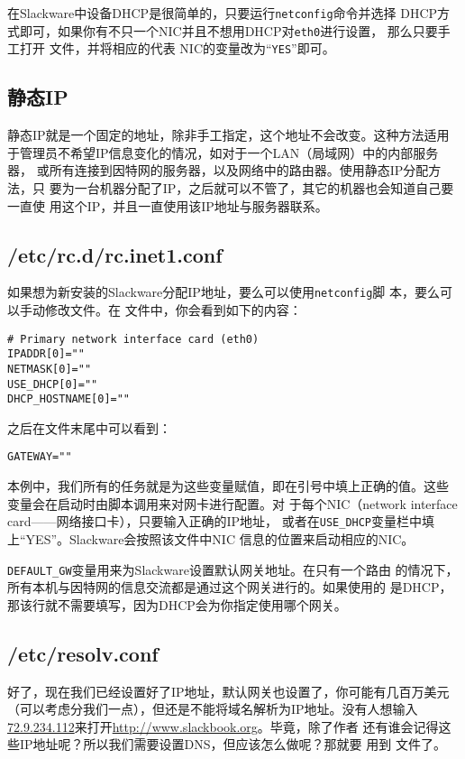 在Slackware中设备DHCP是很简单的，只要运行\texttt{netconfig}命令并选择
DHCP方式即可，如果你有不只一个NIC并且不想用DHCP对\texttt{eth0}进行设置，
那么只要手工打开 文件，并将相应的代表
NIC的变量改为``\texttt{YES}''即可。


\subsection{静态IP}
\label{sec:networkConfiguration:tcpIP:staticIP}
静态IP就是一个固定的地址，除非手工指定，这个地址不会改变。这种方法适用
于管理员不希望IP信息变化的情况，如对于一个LAN（局域网）中的内部服务器，
或所有连接到因特网的服务器，以及网络中的路由器。使用静态IP分配方法，只
要为一台机器分配了IP，之后就可以不管了，其它的机器也会知道自己要一直使
用这个IP，并且一直使用该IP地址与服务器联系。

\subsection{/etc/rc.d/rc.inet1.conf}
\label{sec:networkConfiguration:tcpIP:inet1.conf}
如果想为新安装的Slackware分配IP地址，要么可以使用\texttt{netconfig}脚
本，要么可以手动修改文件。在
文件中，你会看到如下的内容：
\begin{Verbatim}[frame=single,commandchars=\\\{\}]
# Primary network interface card (eth0)
IPADDR[0]=""
NETMASK[0]=""
USE_DHCP[0]=""
DHCP_HOSTNAME[0]=""
\end{Verbatim}
之后在文件末尾中可以看到：
\begin{Verbatim}[frame=single,commandchars=\\\{\}]
GATEWAY=""
\end{Verbatim}
本例中，我们所有的任务就是为这些变量赋值，即在引号中填上正确的值。这些
变量会在启动时由脚本调用来对网卡进行配置。对
于每个NIC（network interface card——网络接口卡），只要输入正确的IP地址，
或者在\texttt{USE\_DHCP}变量栏中填上``YES''。Slackware会按照该文件中NIC
信息的位置来启动相应的NIC。

\texttt{DEFAULT\_GW}变量用来为Slackware设置默认网关地址。在只有一个路由
的情况下，所有本机与因特网的信息交流都是通过这个网关进行的。如果使用的
是DHCP，那该行就不需要填写，因为DHCP会为你指定使用哪个网关。

\subsection{/etc/resolv.conf}
\label{sec:networkConfiguration:tcpIP:resolv.conf}
好了，现在我们已经设置好了IP地址，默认网关也设置了，你可能有几百万美元
（可以考虑分我们一点），但还是不能将域名解析为IP地址。没有人想输入
\url{72.9.234.112}来打开\url{http://www.slackbook.org}。毕竟，除了作者
还有谁会记得这些IP地址呢？所以我们需要设置DNS，但应该怎么做呢？那就要
用到 文件了。

